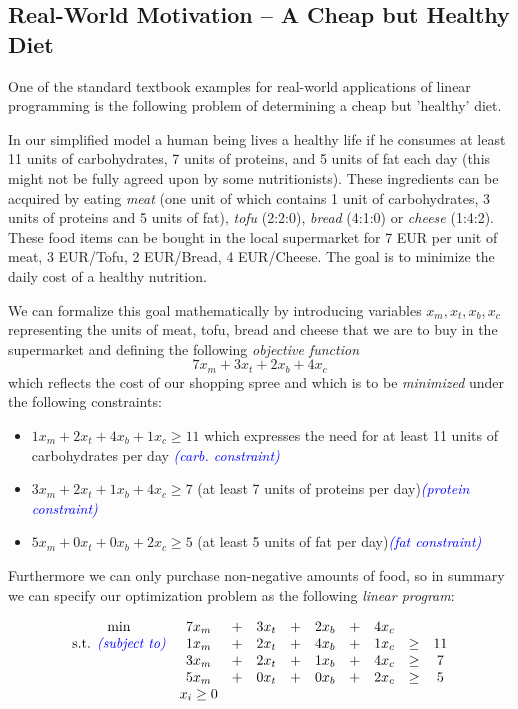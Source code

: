\documentclass{article}
\begin{document}
\subsection{Real-World Motivation -- A Cheap but Healthy Diet}
One of the standard textbook examples for real-world applications of linear programming
is the following problem of determining a cheap but 'healthy' diet.

In our simplified model a human being lives a healthy life if he consumes  at least 11 units of carbohydrates, 7 units of proteins,
 and 5 units of fat each day (this might not be fully agreed upon by some nutritionists).
These ingredients can be acquired by eating \emph{meat} (one unit of which contains 1 unit of carbohydrates, 3 units of proteins and
5 units of fat), \emph{tofu} (2:2:0), \emph{bread} (4:1:0) or \emph{cheese} (1:4:2). These food items can be bought in the local
supermarket for 7 EUR per unit of meat, 3 EUR/Tofu, 2 EUR/Bread, 4 EUR/Cheese. The goal is to minimize the daily cost of
a healthy nutrition. 

We can formalize this goal mathematically by introducing variables $x_m, x_t, x_b, x_c$ representing the
units of meat, tofu, bread and cheese that we are to buy in the supermarket and defining the following
\emph{objective function} 
\[
	7 x_m +3 x_t + 2 x_b +4 x_c
\]
which reflects the cost of our shopping spree and which is to be \emph{minimized} under
the following constraints:
\begin{itemize}
\item $1 x_m + 2 x_t + 4 x_b +1 x_c \geq 11$ which expresses the need for at least 11 units of carbohydrates per day \textcolor{blue}{\emph{(carb. constraint)}}
\item $3 x_m + 2 x_t + 1 x_b + 4 x_c \geq 7$ (at least 7 units of proteins per day)\textcolor{blue}{\emph{(protein constraint)}}
\item $5 x_m + 0 x_t + 0 x_b + 2 x_c \geq 5$ (at least 5 units of fat per day)\textcolor{blue}{\emph{(fat constraint)}}
\end{itemize}
Furthermore we can only purchase non-negative amounts of food, so in summary we can 
specify our optimization problem as the following \emph{linear program}:

\[
\begin{matrix}
	\min	& 7 x_m	&+& 3 x_t&+& 2 x_b&+&4 x_c&&\\  
	\mbox{s.t. \textcolor{blue}{\emph{(subject to)}}}	& 1 x_m &+& 2 x_t&+& 4 x_b&+&1 x_c&\geq&11\\
			& 3 x_m &+& 2 x_t&+& 1 x_b&+&4 x_c&\geq& 7\\
	           	& 5 x_m &+& 0 x_t&+& 0 x_b&+&2 x_c&\geq& 5\\
			& x_i\geq 0\\
\end{matrix}
\]
\end{document}
